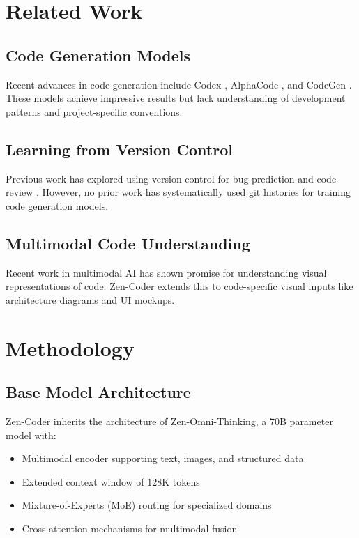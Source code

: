 \documentclass[11pt,a4paper]{article}
\begin{document}
\section{Related Work}

\subsection{Code Generation Models}
Recent advances in code generation include Codex \cite{chen2021evaluating}, AlphaCode \cite{li2022competition}, and CodeGen \cite{nijkamp2022codegen}. These models achieve impressive results but lack understanding of development patterns and project-specific conventions.

\subsection{Learning from Version Control}
Previous work has explored using version control for bug prediction \cite{zimmermann2007predicting} and code review \cite{bacchelli2013expectations}. However, no prior work has systematically used git histories for training code generation models.

\subsection{Multimodal Code Understanding}
Recent work in multimodal AI \cite{ramesh2021zero,alayrac2022flamingo} has shown promise for understanding visual representations of code. Zen-Coder extends this to code-specific visual inputs like architecture diagrams and UI mockups.

\section{Methodology}

\subsection{Base Model Architecture}
Zen-Coder inherits the architecture of Zen-Omni-Thinking, a 70B parameter model with:
\begin{itemize}
    \item Multimodal encoder supporting text, images, and structured data
    \item Extended context window of 128K tokens
    \item Mixture-of-Experts (MoE) routing for specialized domains
    \item Cross-attention mechanisms for multimodal fusion
\end{itemize}
\end{document}
